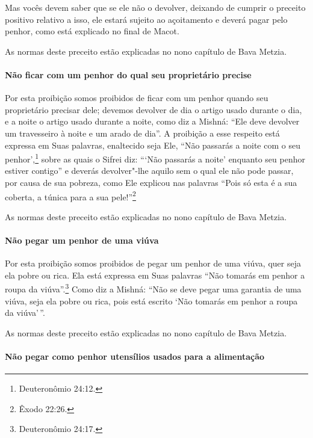 \begin{multicols}{2}
Mas vocês devem saber que se ele não o devolver, deixando de cumprir o
preceito positivo relativo a isso, ele estará sujeito ao açoitamento e
deverá pagar pelo penhor, como está explicado no final de Macot\starr.

As normas deste preceito estão explicadas no nono capítulo de Bava Metzia\starr.

\paragraph{Não ficar com um penhor do qual seu proprietário precise}

Por esta proibição somos proibidos de ficar com um penhor quando seu
proprietário precisar dele; devemos devolver de dia o artigo usado
durante o dia, e a noite o artigo usado durante a noite, como diz a
Mishná\starr: ``Ele deve devolver um travesseiro à noite e um arado de dia''.
A proibição a esse respeito está expressa em Suas palavras, enaltecido
seja Ele, ``Não passarás a noite com o seu penhor',\footnote{Deuteronômio
24:12.} sobre as quais o Sifrei\starr{} diz: ```Não passarás a noite' enquanto
seu penhor estiver contigo'' e deverás devolver"-lhe aquilo sem o qual
ele não pode passar, por causa de sua pobreza, como Ele explicou nas
palavras ``Pois só esta é a sua coberta, a túnica para a sua pele!''\footnote{Êxodo 22:26.}

As normas deste preceito estão explicadas no nono capítulo de Bava Metzia\starr.

\paragraph{Não pegar um penhor de uma viúva}

Por esta proibição somos proibidos de pegar um penhor de uma viúva,
quer seja ela pobre ou rica. Ela está expressa em Suas palavras ``Não
tomarás em penhor a roupa da viúva''.\footnote{Deuteronômio 24:17.} Como diz a
Mishná\starr: ``Não se deve pegar uma garantia de uma viúva, seja ela pobre ou
rica, pois está escrito `Não tomarás em penhor a roupa da viúva'\,''.

As normas deste preceito estão explicadas no nono capítulo de Bava Metzia\starr.

\paragraph{Não pegar como penhor utensílios usados para a alimentação}


\end{multicols}

